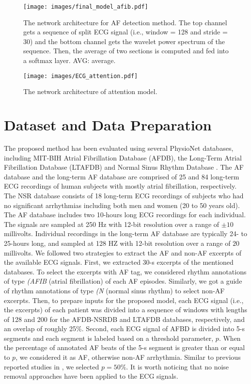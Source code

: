 \documentclass[conference]{IEEEtran}
\begin{document}
\begin{figure*}[htb]
\centering
\texttt{[image: images/final\_model\_afib.pdf]}
  \caption{The network architecture for AF detection method. The top channel gets a sequence of split ECG signal (i.e., window = 128 and stride = 30) and the bottom channel gets the wavelet power spectrum of the sequence. Then, the average of two sections is computed and fed into a softmax layer. AVG: average.} 
  \label{fig:final-model}
\end{figure*}


\begin{figure}[htb]
\centering
\texttt{[image: images/ECG\_attention.pdf]}
  \caption{The network architecture of attention model.}
  \label{fig:ecg_attention}

\end{figure}


\section{Dataset and Data Preparation} 
\label{sec:dataset}
The proposed method has been evaluated using several PhysioNet databases, including  MIT-BIH Atrial Fibrillation Database (AFDB), the Long-Term Atrial Fibrillation Database (LTAFDB)
and Normal Sinus Rhythm Database \cite{PhysioNet}. The AF database and the long-term AF database are comprised of 25 and 84 long-term ECG recordings of human subjects with mostly atrial fibrillation, respectively. The NSR database consists of 18 long-term ECG recordings of subjects who had no significant arrhythmias including both men and women (20 to 50 years old). The AF database includes two 10-hours long ECG recordings for each individual. The signals are sampled at 250 Hz with 12-bit resolution over a range of $\pm10$ millivolts. Individual recordings in the long-term AF database are typically 24- to 25-hours long, and sampled at 128 HZ with 12-bit resolution over a range of $20$ millivolts. 
We followed two strategies to extract the AF and non-AF excerpts of the available ECG signals. First, we extracted 30-s excerpts of the mentioned databases. To select the excerpts with AF tag, we considered rhythm annotations of type \textit{(AFIB} (atrial fibrillation) of each AF episodes. Similarly, we got a guide of rhythm annotations of type \textit{(N} (normal sinus rhythm) to select non-AF excerpts. Then, to prepare inputs for the proposed model, each ECG signal (i.e., the excerpts) of each patient was divided into a sequence of windows with lengths of 128 and 200 for the AFDB-NSRDB and LTAFDB databases, respectively, and an overlap of roughly 25\%. Second, each ECG signal of AFBD is divided into 5-s segments and each segment is labeled based on a threshold parameter, $p$. When the percentage of annotated AF beats of the 5-s segment is greater than or equal to $p$, we considered it as AF, otherwise non-AF arrhythmia. Similar to previous reported studies in \cite{xia2018detecting,asgari2015automatic}, we selected $p=50\%$. It is worth noticing that no noise removal approaches have been applied to the ECG signals.  
\end{document}
